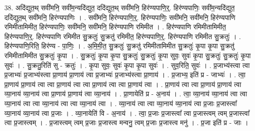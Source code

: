 \documentclass[17pt]{extarticle}
\begin{document}
38. अदि॑द्युत॒थ् सवी॑मनि॒ सवी॑म॒न्यदि॑द्युत॒ ददि॑द्युत॒थ् सवी॑मनि॒ हिर॑ण्यपाणि॒र्॒. हिर॑ण्यपाणिः॒ सवी॑म॒न्यदि॑द्युत॒ ददि॑द्युत॒थ् सवी॑मनि॒ हिर॑ण्यपाणिः । . सवी॑मनि॒ हिर॑ण्यपाणि॒र्॒. हिर॑ण्यपाणिः॒ सवी॑मनि॒ सवी॑मनि॒ हिर॑ण्यपाणि रमिमीतामिमीत॒ हिर॑ण्यपाणिः॒ सवी॑मनि॒ सवी॑मनि॒ हिर॑ण्यपाणि रमिमीत । . हिर॑ण्यपाणि रमिमीतामिमीत॒ हिर॑ण्यपाणि॒र्॒. हिर॑ण्यपाणि रमिमीत सु॒क्रतुः॑ सु॒क्रतु॑ रमिमीत॒ हिर॑ण्यपाणि॒र्॒. हिर॑ण्यपाणि रमिमीत सु॒क्रतुः॑ । . हिर॑ण्यपाणि॒रिति॒ हिर॑ण्य - पा॒णिः॒ । . अ॒मि॒मी॒त॒ सु॒क्रतुः॑ सु॒क्रतु॑ रमिमीतामिमीत सु॒क्रतुः॑ कृ॒पा कृ॒पा सु॒क्रतु॑ रमिमीतामिमीत सु॒क्रतुः॑ कृ॒पा । . सु॒क्रतुः॑ कृ॒पा कृ॒पा सु॒क्रतुः॑ सु॒क्रतुः॑ कृ॒पा सुवः॒ सुवः॑ कृ॒पा सु॒क्रतुः॑ सु॒क्रतुः॑ कृ॒पा सुवः॑ । . सु॒क्रतु॒रिति॑ सु - क्रतुः॑ । . कृ॒पा सुवः॒ सुवः॑ कृ॒पा कृ॒पा सुवः॑ । . सुव॒रिति॒ सुवः॑ । . प्र॒जाभ्य॑स्त्वा त्वा प्र॒जाभ्यः॑ प्र॒जाभ्य॑स्त्वा प्रा॒णाय॑ प्रा॒णाय॑ त्वा प्र॒जाभ्यः॑ प्र॒जाभ्य॑स्त्वा प्रा॒णाय॑ । . प्र॒जाभ्य॒ इति॑ प्र - जाभ्यः॑ । . त्वा॒ प्रा॒णाय॑ प्रा॒णाय॑ त्वा त्वा प्रा॒णाय॑ त्वा त्वा प्रा॒णाय॑ त्वा त्वा प्रा॒णाय॑ त्वा । . प्रा॒णाय॑ त्वा त्वा प्रा॒णाय॑ प्रा॒णाय॑ त्वा व्या॒नाय॑ व्या॒नाय॑ त्वा प्रा॒णाय॑ प्रा॒णाय॑ त्वा व्या॒नाय॑ । . प्रा॒णायेति॑ प्र - अ॒नाय॑ । . त्वा॒ व्या॒नाय॑ व्या॒नाय॑ त्वा त्वा व्या॒नाय॑ त्वा त्वा व्या॒नाय॑ त्वा त्वा व्या॒नाय॑ त्वा । . व्या॒नाय॑ त्वा त्वा व्या॒नाय॑ व्या॒नाय॑ त्वा प्र॒जाः प्र॒जास्त्वा᳚ व्या॒नाय॑ व्या॒नाय॑ त्वा प्र॒जाः । . व्या॒नायेति॑ वि - अ॒नाय॑ । . त्वा॒ प्र॒जाः प्र॒जास्त्वा᳚ त्वा प्र॒जास्त्वम् त्वम् प्र॒जास्त्वा᳚ त्वा प्र॒जास्त्वम् । . प्र॒जास्त्वम् त्वम् प्र॒जाः प्र॒जास्त्व मन्वनु॒ त्वम् प्र॒जाः प्र॒जास्त्व मनु॑ । . प्र॒जा इति॑ प्र - जाः । \newline
\end{document}
